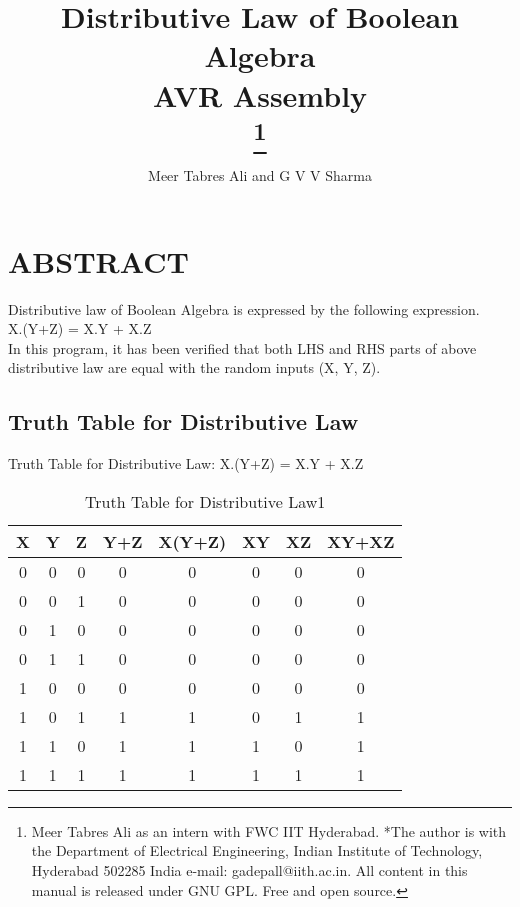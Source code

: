 \documentclass[conference]{IEEEtran}
\begin{document}
\title{
{Distributive Law of Boolean Algebra\\
AVR Assembly}\\

\thanks{Meer Tabres Ali as an intern with FWC IIT Hyderabad. *The author is with the Department of Electrical Engineering, Indian Institute of Technology, Hyderabad 502285 India e-mail: gadepall@iith.ac.in. All content in this manual is released under GNU GPL. Free and open source.}
}
\author{Meer Tabres Ali and G V V Sharma}
\maketitle

\section{ABSTRACT}
\begin{flushleft}
Distributive law of Boolean Algebra is expressed by the following expression.\\
X.(Y+Z) = X.Y + X.Z \\
In this program, it has been verified that both LHS and RHS parts of above distributive law are equal with the random inputs (X, Y, Z).\\
\end{flushleft}

\subsection{Truth Table for Distributive Law}
Truth Table for Distributive Law: X.(Y+Z) = X.Y + X.Z 

\begin{table}[htbp]
    \centering
\begin{tabular}{ | c | c | c | c | c | c | c | c | } \hline
\textbf{X} & \textbf{Y} & \textbf{Z} & \textbf{Y+Z} & \textbf{X(Y+Z)} & \textbf{XY} & \textbf{XZ} & \textbf{XY+XZ} \\\hline
0 & 0 & 0 & 0 & 0 & 0 & 0 & 0 \\
0 & 0 & 1 & 0 & 0 & 0 & 0 & 0 \\
0 & 1 & 0 & 0 & 0 & 0 & 0 & 0 \\
0 & 1 & 1 & 0 & 0 & 0 & 0 & 0 \\
1 & 0 & 0 & 0 & 0 & 0 & 0 & 0 \\
1 & 0 & 1 & 1 & 1 & 0 & 1 & 1 \\
1 & 1 & 0 & 1 & 1 & 1 & 0 & 1 \\
1 & 1 & 1 & 1 & 1 & 1 & 1 & 1 \\ \hline
\end{tabular}
\vspace{0.4cm}
\caption{\label{tab:widgets}Truth Table for Distributive Law1}
\end{table}
\end{document}
